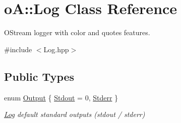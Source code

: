 \hypertarget{classo_a_1_1_log}{}\section{oA\+:\+:Log Class Reference}
\label{classo_a_1_1_log}


O\+Stream logger with color and quotes features.  




{\ttfamily \#include $<$Log.\+hpp$>$}

\subsection*{Public Types}
\begin{DoxyCompactItemize}
\item 
enum \mbox{\hyperlink{classo_a_1_1_log_a640171dc239ea7befcd640362343f88f}{Output}} \{ \mbox{\hyperlink{classo_a_1_1_log_a640171dc239ea7befcd640362343f88fa6504dea4a3bf34c8734b664b6364a0d9}{Stdout}} = 0, 
\mbox{\hyperlink{classo_a_1_1_log_a640171dc239ea7befcd640362343f88faa01279ed925a2480f04ad2d89bf1722a}{Stderr}}
 \}
\begin{DoxyCompactList}\small\item\em \mbox{\hyperlink{classo_a_1_1_log}{Log}} default standard outputs (stdout / stderr) \end{DoxyCompactList}\end{DoxyCompactItemize}
